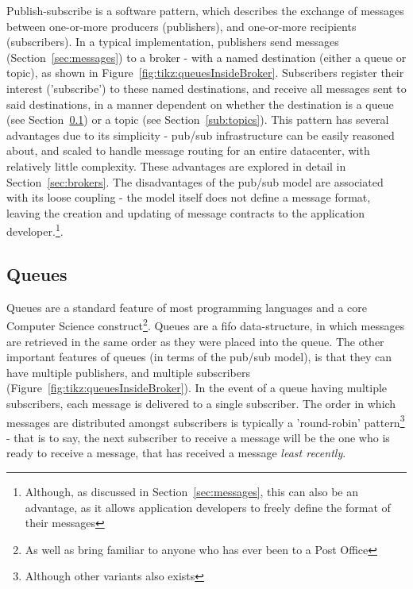 Publish-subscribe is a software pattern, which describes the exchange of
messages between one-or-more producers (publishers), and one-or-more recipients
(subscribers). In a typical implementation, publishers send messages
(Section~\ref{sec:messages}) to a broker - with a named destination (either a
queue or topic), as shown in Figure~\ref{fig:tikz:queuesInsideBroker}.
Subscribers register their interest ('subscribe') to these named destinations,
and receive all messages sent to said destinations, in a manner dependent on
whether the destination is a queue (see Section~\ref{sub:queues}) or a topic
(see Section~\ref{sub:topics}). This pattern has several advantages due to its
simplicity - pub/sub infrastructure can be easily reasoned about, and scaled to
handle message routing for an entire datacenter, with relatively little
complexity. These advantages are explored in detail in
Section~\ref{sec:brokers}. The disadvantages of the pub/sub model are associated
with its loose coupling - the model itself does not define a message format,
leaving the creation and updating of message contracts to the application
developer.\footnote{Although, as discussed in Section~\ref{sec:messages}, this
can also be an advantage, as it allows application developers to freely define
the format of their messages}.

\subsection{Queues}
\label{sub:queues}

Queues are a standard feature of most programming languages and a core Computer
Science construct\footnote{As well as bring familiar to anyone who has ever been
to a Post Office}. Queues are a \gls{fifo} data-structure, in which messages are
retrieved in the same order as they were placed into the queue. The other
important features of queues (in terms of the pub/sub model), is that they can
have multiple publishers, and multiple subscribers
(Figure~\ref{fig:tikz:queuesInsideBroker}). In the event of a queue having
multiple subscribers, each message is delivered to a single subscriber. The
order in which messages are distributed amongst subscribers is typically a
'round-robin' pattern\footnote{Although other variants also exists} - that is to
say, the next subscriber to receive a message will be the one who is ready to
receive a message, that has received a message \emph{least recently}.

